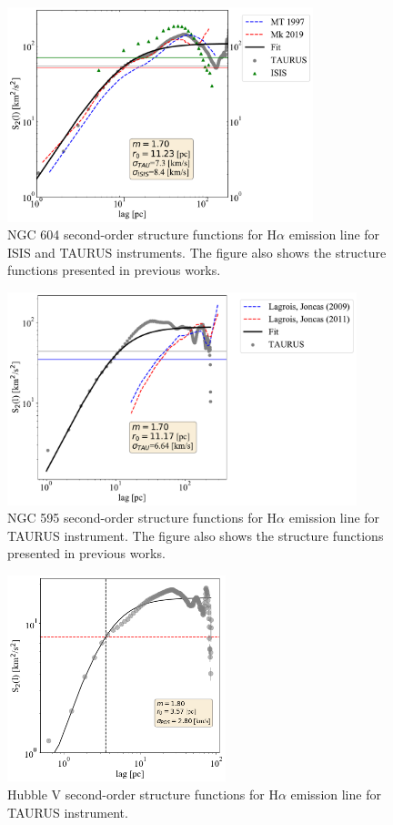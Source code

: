 \documentclass[fleqn,usenatbib]{mnras}
\begin{document}
\begin{figure}
\centering 
\includegraphics[width=3.5in]{Figures/SF604.pdf}
\caption{NGC 604 second-order structure functions for H$\alpha$ emission line for ISIS and TAURUS instruments. The figure also shows the structure functions presented in previous works.}
\label{fig:SF604}
\end{figure}

\begin{figure}
\centering 
\includegraphics[width=4in]{Figures/SF595.pdf}
\caption{NGC 595 second-order structure functions for H$\alpha$ emission line for TAURUS instrument. The figure also shows the structure functions presented in previous works.}
\label{fig:SF595}
\end{figure}

\begin{figure}
\centering 
\includegraphics[width=2.5in]{Figures/HV}
\caption{Hubble V second-order structure functions for H$\alpha$ emission line for TAURUS instrument.}
\label{fig:SFV}
\end{figure}
\end{document}
